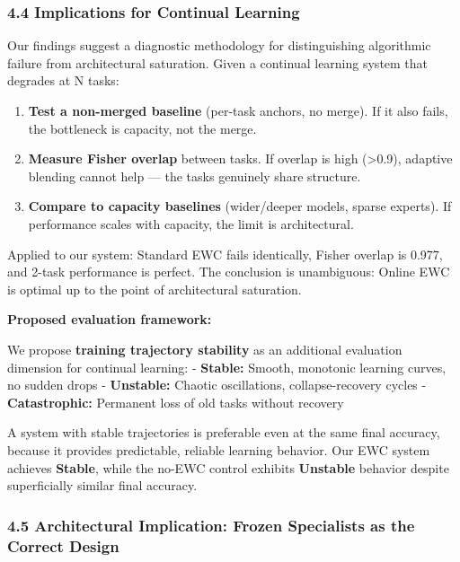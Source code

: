 \documentclass[
]{article}
\providecommand{\tightlist}{%
  \setlength{\itemsep}{0pt}\setlength{\parskip}{0pt}}
\begin{document}
\subsubsection{4.4 Implications for Continual
Learning}\label{implications-for-continual-learning}

Our findings suggest a diagnostic methodology for distinguishing
algorithmic failure from architectural saturation. Given a continual
learning system that degrades at N tasks:

\begin{enumerate}
\def\labelenumi{\arabic{enumi}.}
\tightlist
\item
  \textbf{Test a non-merged baseline} (per-task anchors, no merge). If
  it also fails, the bottleneck is capacity, not the merge.
\item
  \textbf{Measure Fisher overlap} between tasks. If overlap is high
  (\textgreater0.9), adaptive blending cannot help --- the tasks
  genuinely share structure.
\item
  \textbf{Compare to capacity baselines} (wider/deeper models, sparse
  experts). If performance scales with capacity, the limit is
  architectural.
\end{enumerate}

Applied to our system: Standard EWC fails identically, Fisher overlap is
0.977, and 2-task performance is perfect. The conclusion is unambiguous:
Online EWC is optimal up to the point of architectural saturation.

\textbf{Proposed evaluation framework:}

We propose \textbf{training trajectory stability} as an additional
evaluation dimension for continual learning: - \textbf{Stable:} Smooth,
monotonic learning curves, no sudden drops - \textbf{Unstable:} Chaotic
oscillations, collapse-recovery cycles - \textbf{Catastrophic:}
Permanent loss of old tasks without recovery

A system with stable trajectories is preferable even at the same final
accuracy, because it provides predictable, reliable learning behavior.
Our EWC system achieves \textbf{Stable}, while the no-EWC control
exhibits \textbf{Unstable} behavior despite superficially similar final
accuracy.

\subsubsection{4.5 Architectural Implication: Frozen Specialists as the
Correct
Design}\label{architectural-implication-frozen-specialists-as-the-correct-design}
\end{document}
